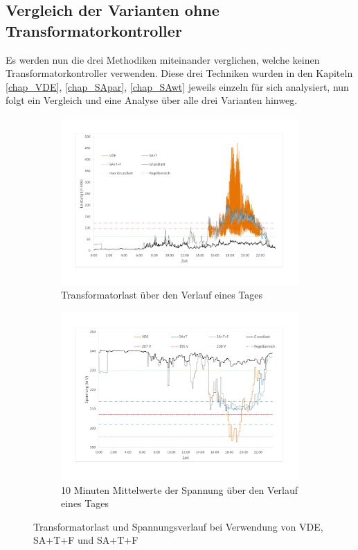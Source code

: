 \subsection{Vergleich der Varianten ohne Transformatorkontroller}
Es werden nun die drei Methodiken miteinander verglichen, welche keinen Transformatorkontroller verwenden. Diese drei Techniken wurden in den Kapiteln \ref{chap_VDE}, \ref{chap_SApar}, \ref{chap_SAwt} jeweils einzeln für sich analysiert, nun folgt ein Vergleich und eine Analyse über alle drei Varianten hinweg.
\begin{figure}
	\begin{subfigure}{\linewidth}
		\includegraphics[scale=0.45]{img/ohneTrafo/TrafoLast6.pdf}
		\caption{Transformatorlast über den Verlauf eines Tages}
		\label{Abb_oT_TrafoLast}
	\end{subfigure}
	\begin{subfigure}{\linewidth}
		\includegraphics[scale=0.45]{img/ohneTrafo/Spannung5.pdf}
		\caption{10 Minuten Mittelwerte der Spannung über den Verlauf eines Tages}
		\label{Abb_oT_Spannung}
	\end{subfigure}
	\caption{Transformatorlast und Spannungsverlauf bei Verwendung von VDE, SA+T+F und SA+T+F}
\end{figure}
